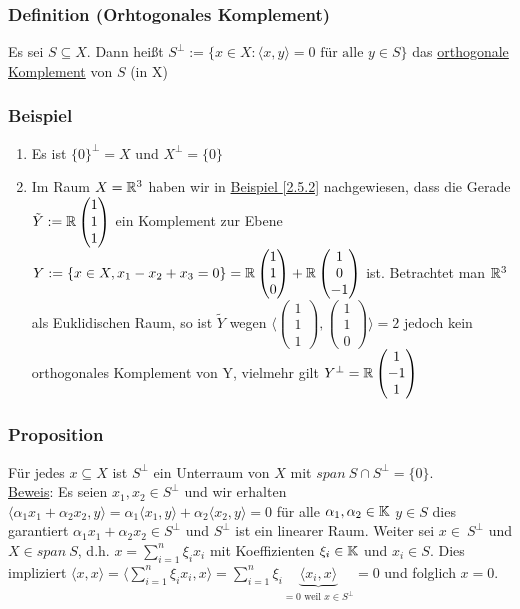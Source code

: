 \subsubsection{Definition (Orhtogonales Komplement)}
Es sei $S \subseteq X$. Dann heißt $S^\bot:=\{x\in X:\langle x,y \rangle =0\text{ für alle }y\in S\}$
 das \underline{orthogonale Komplement} von $S$ (in X)
\subsubsection{Beispiel}
\numbers
\begin{enumerate}
\item Es ist $\{0\}^\bot=X$ und $X^{\bot}=\{0\}$
\item Im Raum $X=\mathbb{R}^3$ haben wir in \hyperref[2.5.2]{Beispiel \ref*{2.5.2}} nachgewiesen, dass die Gerade $\tilde{Y}:=\mathbb{R}\begin{pmatrix}1 \\1 \\1\end{pmatrix}$ ein Komplement zur Ebene $Y:=\{x\in X, x_1-x_2+x_3=0\}=\mathbb{R}\begin{pmatrix}1\\1\\0\end{pmatrix}+\mathbb{R}\begin{pmatrix}1\\0\\-1\end{pmatrix}$ ist.
Betrachtet man $\mathbb{R}^3$ als Euklidischen Raum, so ist $\tilde{Y}$ wegen $\langle \begin{pmatrix}1 \\1 \\1\end{pmatrix},\begin{pmatrix}1 \\1 \\0\end{pmatrix}\rangle=2$ jedoch kein orthogonales Komplement von Y, vielmehr gilt $Y^{\bot}=\mathbb{R}\begin{pmatrix}1 \\-1 \\1\end{pmatrix}$
\end{enumerate}
\subsubsection{Proposition}
\label{5.1.9}
Für jedes $x\subseteq X$ ist $S^{\bot}$ ein Unterraum von $X$ mit $span\ S\cap S^{\bot}=\{0\}$.\\
\underline{Beweis}: Es seien $x_1,x_2\in S^{\bot}$ und wir erhalten $\langle \alpha_1 x_1+\alpha_2 x_2,y\rangle=\alpha_1\langle x_1,y\rangle+\alpha_2\langle x_2,y\rangle=0$ für alle $\alpha_1,\alpha_2\in\mathbb{K}$ $y\in S$ dies garantiert $\alpha_1 x_1+\alpha_2 x_2\in S^{\bot}$ und $S^{\bot}$ ist ein linearer Raum.
Weiter sei $x\in\ S^{\bot}$ und $X\in span~S$, d.h. $x=\sum_{i=1}^n \xi_i x_i$ mit Koeffizienten $\xi_i\in \mathbb{K}$ und $x_i\in S$. Dies impliziert $\langle x,x\rangle=\langle \sum_{i=1}^n \xi_i x_i,x\rangle=\sum_{i=1}^n\xi_i \underbrace{\langle x_i,x\rangle}_{=0\text{ weil }x\in S^{\bot}}=0$ und folglich $x=0$.
